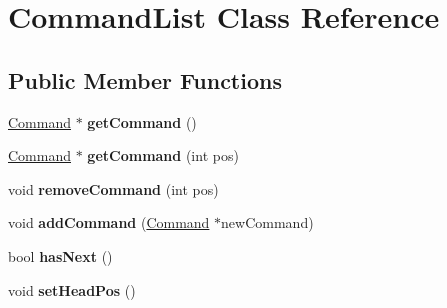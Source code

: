 \hypertarget{class_command_list}{}\section{Command\+List Class Reference}
\label{class_command_list}
\subsection*{Public Member Functions}
\begin{DoxyCompactItemize}
\item 
\hypertarget{class_command_list_a0e24076e79f1ebe5a8cf3992873603fa}{}\hyperlink{class_command}{Command} $\ast$ {\bfseries get\+Command} ()\label{class_command_list_a0e24076e79f1ebe5a8cf3992873603fa}

\item 
\hypertarget{class_command_list_a5d11d429c550a38d9ba77ad8bc717ab9}{}\hyperlink{class_command}{Command} $\ast$ {\bfseries get\+Command} (int pos)\label{class_command_list_a5d11d429c550a38d9ba77ad8bc717ab9}

\item 
\hypertarget{class_command_list_a7faf17dcf8101bf2787ddde0e4a81353}{}void {\bfseries remove\+Command} (int pos)\label{class_command_list_a7faf17dcf8101bf2787ddde0e4a81353}

\item 
\hypertarget{class_command_list_a01627f4070f628f40b3a46bed51afc86}{}void {\bfseries add\+Command} (\hyperlink{class_command}{Command} $\ast$new\+Command)\label{class_command_list_a01627f4070f628f40b3a46bed51afc86}

\item 
\hypertarget{class_command_list_a8482ecf6e3a1c11e863fc007d6bf3365}{}bool {\bfseries has\+Next} ()\label{class_command_list_a8482ecf6e3a1c11e863fc007d6bf3365}

\item 
\hypertarget{class_command_list_a894298803e476f35ac17ab1424a11922}{}void {\bfseries set\+Head\+Pos} ()\label{class_command_list_a894298803e476f35ac17ab1424a11922}

\end{DoxyCompactItemize}
